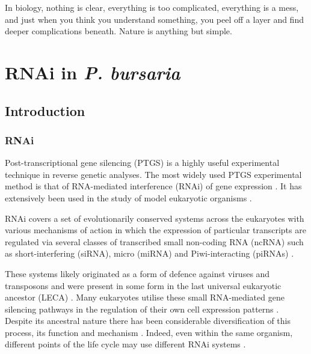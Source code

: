 \graphicspath{{chapters/6.Chapter_4/figures/}}

\begin{savequote}[75mm]
In biology, nothing is clear, everything is too complicated, everything is a mess, 
and just when you think you understand something, you peel off a layer and find 
deeper complications beneath. Nature is anything but simple.
\end{savequote}

\chapter{RNAi in \textit{P. bursaria}}

\section{Introduction}

\subsection{RNAi}

Post-transcriptional gene silencing (PTGS) is a highly useful experimental technique
in reverse genetic analyses.
The most widely used PTGS experimental method is that of RNA-mediated interference (RNAi)
of gene expression \citep{Fire1998}. It has extensively been used in the
study of model eukaryotic organisms \citep{Morf2013,Batista2011,Matthew2004,Ketting2011,Chang2012}.

RNAi covers a set of evolutionarily conserved systems across the eukaryotes 
with various mechanisms of action in which the expression of particular transcripts
are regulated via several classes of transcribed small non-coding RNA (ncRNA)
such as short-interfering (siRNA), micro (miRNA) and Piwi-interacting (piRNAs) \citep{Carthew2009}.

These systems likely originated as a form of defence against
viruses and transposons \citep{Waterhouse2001,Buchon2006}
and were present in some form in the last universal eukaryotic
ancestor (LECA) \citep{Cerutti2006,Shabalina2008}.  Many eukaryotes
utilise these small RNA-mediated gene silencing pathways
in the regulation of their own cell expression patterns \citep{Wu2008}.
Despite its ancestral nature there has been considerable diversification
of this process, its function and mechanism \citep{Ketting2011}.
Indeed, even within the same organism, different points of the life cycle
may use different RNAi systems \citep{Flemr2013}.


